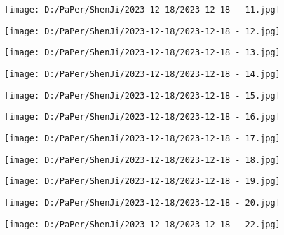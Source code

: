 \documentclass{article}
\begin{document}
\begin{figure}[h!]
	\centering
	\texttt{[image: D:/PaPer/ShenJi/2023-12-18/2023-12-18 - 11.jpg]}
\end{figure}

\begin{figure}[h!]
	\centering
	\texttt{[image: D:/PaPer/ShenJi/2023-12-18/2023-12-18 - 12.jpg]}
\end{figure}

\begin{figure}[h!]
	\centering
	\texttt{[image: D:/PaPer/ShenJi/2023-12-18/2023-12-18 - 13.jpg]}
\end{figure}

\begin{figure}[h!]
	\centering
	\texttt{[image: D:/PaPer/ShenJi/2023-12-18/2023-12-18 - 14.jpg]}
\end{figure}

\begin{figure}[h!]
	\centering
	\texttt{[image: D:/PaPer/ShenJi/2023-12-18/2023-12-18 - 15.jpg]}
\end{figure}

\begin{figure}[h!]
	\centering
	\texttt{[image: D:/PaPer/ShenJi/2023-12-18/2023-12-18 - 16.jpg]}
\end{figure}

\begin{figure}[h!]
	\centering
	\texttt{[image: D:/PaPer/ShenJi/2023-12-18/2023-12-18 - 17.jpg]}
\end{figure}

\begin{figure}[h!]
	\centering
	\texttt{[image: D:/PaPer/ShenJi/2023-12-18/2023-12-18 - 18.jpg]}
\end{figure}

\begin{figure}[h!]
	\centering
	\texttt{[image: D:/PaPer/ShenJi/2023-12-18/2023-12-18 - 19.jpg]}
\end{figure}

\begin{figure}[h!]
	\centering
	\texttt{[image: D:/PaPer/ShenJi/2023-12-18/2023-12-18 - 20.jpg]}
\end{figure}

\begin{figure}[h!]
	\centering
	\texttt{[image: D:/PaPer/ShenJi/2023-12-18/2023-12-18 - 22.jpg]}
\end{figure}
\end{document}
